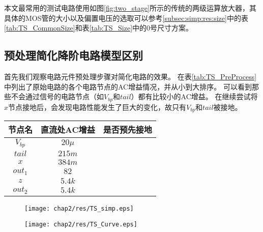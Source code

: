 本文最常用的测试电路使用如图\ref{fig:two_stage}所示的传统的两级运算放大器，其具体的MOS管的大小以及偏置电压的选取可以参考\ref{subsec:simp:res:size}中的表\ref{tab:TS_CommonSize}和表\ref{tab:TS_Size}中的0号尺寸方案。

\subsection{预处理简化降阶电路模型区别}
\label{subsec:simp:res:pre}

首先我们观察电路元件预处理步骤对简化电路的效果。
在表\ref{tab:TS_PreProcess}中列出了原始电路的各个电路节点的AC增益情况，并从小到大排序。
可以看到那些不会通过信号的电路节点（如$V_{bp}$和$tail$）都有比较小的AC增益。
在继续尝试将$x$节点接地后，会发现电路性能发生了巨大的变化，故只有$V_{bp}$和$tail$被接地。

\begin{table}[!htbp]
	\centering
	\begin{tabular}{c|c|c}
		\hline
		  节点名    & 直流处AC增益 &   是否预先接地   \\ \hline
		$V_{bp}$ & $20\mu$ & \checkmark \\
		 $tail$  & $215m$  & \checkmark \\
		  $x$    & $384m$  & \texttimes \\
		$out_1$  &  $82$   & \texttimes \\
		  $z$    & $5.4k$  & \texttimes \\
		$out_2$  & $5.4k$  & \texttimes \\ \hline
	\end{tabular}
\end{table}

\begin{figure}[!htp]
	\centering
	\texttt{[image: chap2/res/TS\_simp.eps]}
\end{figure}

\begin{figure}[!htp]
	\centering
	\texttt{[image: chap2/res/TS\_Curve.eps]}
\end{figure}

